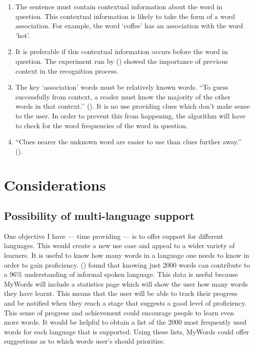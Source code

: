 \begin{enumerate}
\item The sentence must contain contextual information about the word in question. This contextual information is likely to take the form of a word association. For example, the word `coffee’ has an association with the word `hot’. 
\item It is preferable if this contextual information occurs before the word in question. The experiment run by (\cite{swinney1979lexical}) showed the importance of previous context in the recognition process. 
\item The key `association’ words must be relatively known words. ``To guess successfully from context, a reader must know the majority of the other words in that context.’' (\cite{schmitt1997vocabulary}). It is no use providing clues which don’t make sense to the user. In order to prevent this from happening, the algorithm will have to check for the word frequencies of the word in question.
\item ``Clues nearer the unknown word are easier to use than clues further away.’' (\cite{schmitt1997vocabulary}).
\end{enumerate}

\section{Considerations}
\subsection{Possibility of multi-language support}
One objective I have --- time providing --- is to offer support for different languages. This would create a new use case and appeal to a wider variety of learners. It is useful to know how many words in a language one needs to know in order to gain proficiency. (\cite{university1956study}) found that knowing just 2000 words can contribute to a 96\% understanding of informal spoken language. This data is useful because MyWords will include a statistics page which will show the user how many words they have learnt. This means that the user will be able to track their progress and be notified when they reach a stage that suggests a good level of proficiency. This sense of progress and achievement could encourage people to learn even more words. It would be helpful to obtain a list of the 2000 most frequently used words for each language that is supported. Using these lists, MyWords could offer suggestions as to which words user’s should prioritise. \\

